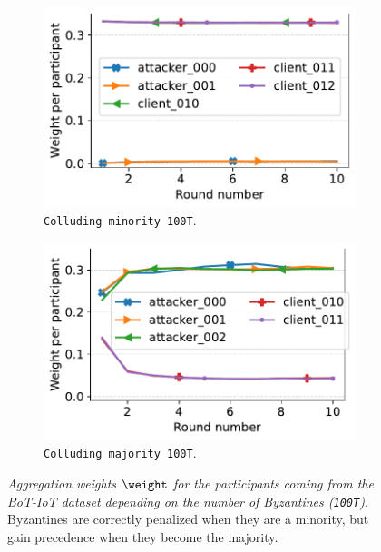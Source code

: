 \begin{figure}
  \begin{subfigure}[t]{0.4\linewidth}
    \centering
    \includegraphics[trim=0 0 10pt 0,clip,width=\linewidth]{figures/reput/byzantine_minority_loud_expanded.pdf}
    \caption{\footnotesize\texttt{Colluding~minority~100T}.}
    \label{fig:reput_byzantine.minority}
    \end{subfigure}
  \qquad 
  \begin{subfigure}[t]{0.4\linewidth}
    \centering
    \includegraphics[trim=0 0 10pt 0,clip,width=\linewidth]{figures/reput/byzantine_majority_loud_expanded.pdf}
    \caption{\footnotesize\texttt{Colluding~majority~100T}.}
    \label{fig:reput_byzantine.majority}
  \end{subfigure}
  \caption{
    \emph{Aggregation weights $\weight$ for the participants coming from the BoT-IoT dataset depending on the number of Byzantines (\texttt{100T}). } 
    Byzantines are correctly penalized when they are a minority, but gain precedence when they become the majority.
  }
  \label{fig:reput_byzantine}
\end{figure}

